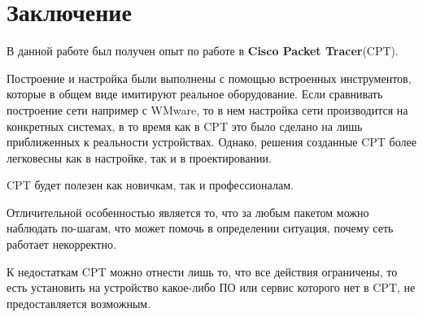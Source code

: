 \section{Заключение}
В данной работе был получен опыт по работе в \textbf{Cisco Packet Tracer}(CPT).


Построение и настройка были выполнены с помощью встроенных инструментов, которые в общем виде имитируют реальное оборудование. Если сравнивать построение сети например с WMware, то в нем настройка сети производится на конкретных системах, в то время как в CPT это было сделано на лишь приближенных к реальности устройствах. Однако, решения созданные CPT более легковесны как в настройке, так и в проектировании.

CPT будет полезен как новичкам, так и профессионалам.

Отличительной особенностью является то, что за любым пакетом можно наблюдать по-шагам, что может помочь в определении ситуация, почему сеть работает некорректно.

К недостаткам CPT можно отнести лишь то, что все действия ограничены, то есть установить на устройство какое-либо ПО или сервис которого нет в CPT, не предоставляется возможным.




\clearpage
\nocite{tutu}
\nocite{tutu2}
\nocite{admin1}
\nocite{habr1}
\nocite{habr2}



